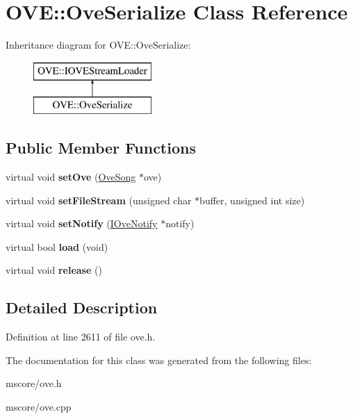 \hypertarget{class_o_v_e_1_1_ove_serialize}{}\section{O\+VE\+:\+:Ove\+Serialize Class Reference}
\label{class_o_v_e_1_1_ove_serialize}
Inheritance diagram for O\+VE\+:\+:Ove\+Serialize\+:\begin{figure}[H]
\begin{center}
\leavevmode
\includegraphics[height=2.000000cm]{class_o_v_e_1_1_ove_serialize}
\end{center}
\end{figure}
\subsection*{Public Member Functions}
\begin{DoxyCompactItemize}
\item 
\mbox{\label{class_o_v_e_1_1_ove_serialize_a9c4224d1a069ca8d8cdf1d2e47c351b3}} 
virtual void {\bfseries set\+Ove} (\hyperlink{class_o_v_e_1_1_ove_song}{Ove\+Song} $\ast$ove)
\item 
\mbox{\label{class_o_v_e_1_1_ove_serialize_a2c7fd55f5d52a14b8ba650860f3c2cdd}} 
virtual void {\bfseries set\+File\+Stream} (unsigned char $\ast$buffer, unsigned int size)
\item 
\mbox{\label{class_o_v_e_1_1_ove_serialize_a82e6ab1ae4337f8902b5f533b7532029}} 
virtual void {\bfseries set\+Notify} (\hyperlink{class_o_v_e_1_1_i_ove_notify}{I\+Ove\+Notify} $\ast$notify)
\item 
\mbox{\label{class_o_v_e_1_1_ove_serialize_a15a87d7f3b9d24548c2d2f501604b4f1}} 
virtual bool {\bfseries load} (void)
\item 
\mbox{\label{class_o_v_e_1_1_ove_serialize_a645127fb93b7f8eeddd3e71fa8bbf84e}} 
virtual void {\bfseries release} ()
\end{DoxyCompactItemize}


\subsection{Detailed Description}


Definition at line 2611 of file ove.\+h.



The documentation for this class was generated from the following files\+:\begin{DoxyCompactItemize}
\item 
mscore/ove.\+h\item 
mscore/ove.\+cpp\end{DoxyCompactItemize}
